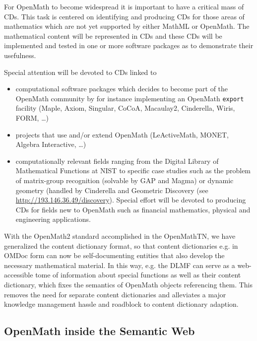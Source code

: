 \documentclass{euproposal}
\begin{document}
For OpenMath to become widespread it is important to have a critical
mass of CDs. This task is centered on identifying and producing CDs
for those areas of mathematics which are not yet supported by either
MathML or OpenMath. The mathematical content will be represented in
CDs and these CDs will be implemented and tested in one or more
software packages as to demonstrate their usefulness.

Special attention will be devoted to CDs linked to 
\begin{itemize}
\item computational software packages which decides to become part of
  the OpenMath community by for instance implementing an OpenMath
  \texttt{export} facility (Maple, Axiom, Singular, CoCoA, Macaulay2,
  Cinderella, Wiris, FORM, \ldots)
\item projects that use and/or extend OpenMath (LeActiveMath, MONET,
  Algebra Interactive, \ldots)
\item computationally relevant fields ranging from the Digital Library
  of Mathematical Functions at NIST to specific case studies such as
  the problem of matrix-group recognition (solvable by GAP and Magma)
  or dynamic geometry (handled by Cinderella and Geometric Discovery
  (see {\url{http://193.146.36.49/discovery}}). Special effort will be
  devoted to producing CDs for fields new to OpenMath such as
  financial mathematics, physical and engineering applications.
\end{itemize}
With the OpenMath2 standard accomplished in the OpenMathTN, we have generalized
the content dictionary format, so that content dictionaries e.g. in OMDoc form can
now be self-documenting entities that also develop the necessary mathematical
material. In this way, e.g. the DLMF can serve as a web-accessible tome of
information about special functions as well as their content dictionary, which
fixes the semantics of OpenMath objects referencing them. This removes the need
for separate content dictionaries and alleviates a major knowledge management
hassle and roadblock to content dictionary adaption.

\subsection{OpenMath inside the Semantic Web}
\end{document}
